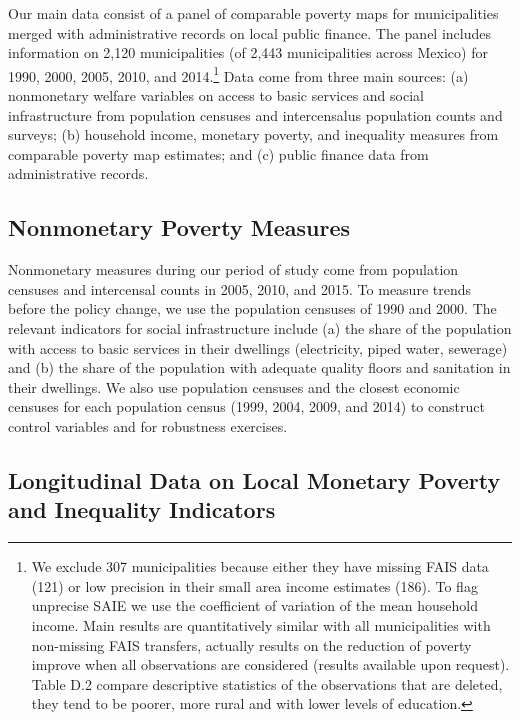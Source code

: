 \documentclass[dv_diss_main.tex]{subfiles}
\begin{document}
Our main data consist of a panel of comparable poverty maps for municipalities merged with administrative records on local public finance. The panel includes information on 2,120 municipalities (of 2,443 municipalities across Mexico) for 1990, 2000, 2005, 2010, and 2014.\footnote{ We exclude 307 municipalities because either they have missing FAIS data (121) or low precision in their small area income estimates (186). To flag unprecise SAIE we use the coefficient of variation of the mean household income. Main results are quantitatively similar with all municipalities with non-missing FAIS transfers, actually results on the reduction of poverty improve when all observations are considered (results available upon request). Table D.2 compare descriptive statistics of the observations that are deleted, they tend to be poorer, more rural and with lower levels of education.} Data come from three main sources: (a) nonmonetary welfare variables on access to basic services and social infrastructure from population censuses and intercensalus population counts and surveys; (b) household income, monetary poverty, and inequality measures from comparable poverty map estimates; and (c) public finance data from administrative records.

\subsection {Nonmonetary Poverty Measures} \label{subsec:non}

Nonmonetary measures during our period of study come from population censuses and intercensal counts in 2005, 2010, and 2015. To measure trends before the policy change, we use the population censuses of 1990 and 2000. The relevant indicators for social infrastructure include (a) the share of the population with access to basic services in their dwellings (electricity, piped water, sewerage) and (b) the share of the population with adequate quality floors and sanitation in their dwellings. We also use population censuses and the closest economic censuses for each population census (1999, 2004, 2009, and 2014) to construct control variables and for robustness exercises.

\subsection {Longitudinal Data on Local Monetary Poverty and Inequality Indicators}\label{subsec:monentary}
\end{document}
